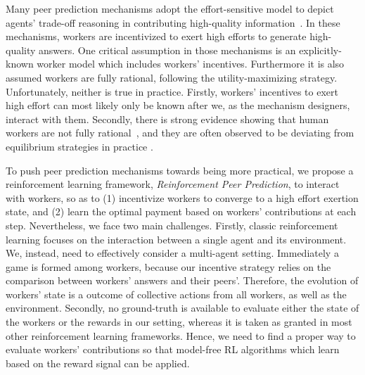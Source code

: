 \documentclass[letterpaper]{article} %
\begin{document}
Many peer prediction mechanisms adopt the effort-sensitive model to depict agents' trade-off reasoning in contributing high-quality information~\cite{witkowski2013dwelling,dasgupta2013crowdsourced,shnayder2016informed,liu2017sequential}. In these mechanisms, workers are incentivized to exert high efforts to generate high-quality answers.
One critical assumption in those mechanisms is an explicitly-known worker model which includes workers' incentives. Furthermore it is also assumed workers are fully rational, following the utility-maximizing strategy. Unfortunately, neither is true in practice. Firstly, workers' incentives %
to exert high effort can most likely only be known after we, as the mechanism designers, interact with them. Secondly, there is strong evidence showing that human workers are not fully rational~\cite{simon1979rational}, and they are often observed to be deviating from equilibrium strategies in practice \cite{mckelvey1995quantal,jurca2007robust}.

To push peer prediction mechanisms towards being more practical, we propose a reinforcement learning framework, \emph{Reinforcement Peer Prediction}, to interact with workers, so as to (1) incentivize workers to converge to a high effort exertion state, and (2) learn the optimal payment based on workers' contributions at each step.
Nevertheless, we face two main challenges.
Firstly, classic reinforcement learning focuses on the interaction between a single agent and its environment. We, instead, need to effectively consider a multi-agent setting. Immediately a game is formed among workers, because our incentive strategy relies on the comparison between workers' answers and their peers'. Therefore, the evolution of workers' state is a outcome of collective actions from all workers, as well as the environment. Secondly, no ground-truth is available to evaluate either the state of the workers or the rewards in our setting, whereas it is taken as granted in most other reinforcement learning frameworks. Hence, we need to find a proper way to evaluate workers' contributions so that model-free RL algorithms which learn based on the reward signal can be applied.
\end{document}
